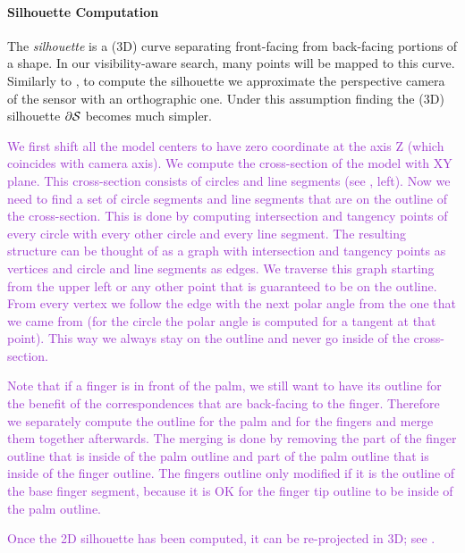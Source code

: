 
\paragraph{Silhouette Computation}
The \emph{silhouette} is a (3D) curve separating front-facing from back-facing portions of a shape.  In our visibility-aware search, many points will be mapped to this curve. Similarly to \cite{tagliasacchi2015robust}, to compute the silhouette we approximate the perspective camera of the sensor with an orthographic one. Under this assumption finding the (3D) silhouette $\partial \mathcal{S}$ becomes much simpler. 

\textcolor{DarkOrchid} {
We first shift all the model centers to have zero coordinate at the axis Z (which coincides with camera axis). We compute the cross-section of the model with XY plane. This cross-section consists of  circles and line segments (see , left). Now we need to find a set of circle segments and line segments that are on the outline of the cross-section. This is done by computing intersection and tangency points of every circle with every other circle and every line segment. The resulting structure can be thought of as a graph with intersection and tangency points as vertices and circle and line segments as edges. We traverse this graph starting from the upper left or any other point that is guaranteed to be on the outline. From every vertex we follow the edge with the next polar angle from the one that we came from (for the circle the polar angle is computed for a tangent at that point). This way  we always stay on the outline and never go inside of the cross-section.
}

\textcolor{DarkOrchid} {
Note that if a finger is in front of the palm, we still want to have its outline for the benefit of the correspondences that are back-facing to the finger.
Therefore we separately compute the outline for the palm and for the fingers and merge them together afterwards. The merging is done by removing the part of the finger outline that is inside of the palm outline and part of the palm outline that is inside of the finger outline. The fingers outline only modified if it is the outline of the base finger segment, because it is OK for the finger tip outline to be inside of the palm outline.
}

\textcolor{DarkOrchid} {
Once the 2D silhouette has been computed, it can be re-projected in 3D; see .
}


\FINISH
